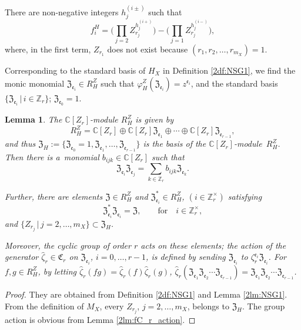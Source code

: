 \documentclass[pdftex]{sigma}
\def\CC{{\mathbb C}}
\def\ZZ{{\mathbb Z}}
\def\fC{{\mathfrak C}}
\def\fZ{{\mathfrak Z}}
\def\fe{{\mathfrak e}}
\def\hzeta{{\widehat \zeta}}
\numberwithin{equation}{section}
\newtheorem{Lemma}[Theorem]{Lemma}
\begin{document}
There are non-negative integers $h_j^{(i\pm)}$ such that
\begin{equation}
f^H_i =
\bigg(
\prod_{j=2} Z_{r_j}^{h_j^{(i+)}}
\bigg)
-\bigg(
\prod_{j=1} Z_{r_j}^{h_j^{(i-)}}
\bigg),
\label{2eq:f^H_iZ}
\end{equation}
where, in the first term, $Z_{r_1}$ does not exist because $(r_1, r_2, \dots, r_{m_X})=1$.





Corresponding to the standard basis of $H_X$ in Definition \ref{2df:NSG1}, we find the monic monomial $\fZ_{\fe_i} \in R_H^Z$ such that $\varphi^Z_H(\fZ_{\fe_i}) = z^{\fe_i}$, and the standard basis $\{\fZ_{\fe_i}\, |\, i \in \ZZ_r\}$; $\fZ_{\fe_0}=1$.

\begin{Lemma}\label{2lm:Z_standardbasis}
The $\CC[Z_r]$-module $R_H^Z$ is given by
\[
R_H^Z=\CC[Z_r]\oplus \CC[Z_r]\fZ_{\fe_1}\oplus \cdots
\oplus \CC[Z_r]\fZ_{\fe_{r-1}},
\]
and thus $\fZ_H:=\{\fZ_{\fe_0}=1, \fZ_{\fe_1}, \dots, \fZ_{\fe_{r-1}}\}$ is the basis of the $\CC[Z_r]$-module~$R_H^Z$.
Then there is a~monomial $b_{i j k}\in \CC[Z_r]$ such that
\[
\fZ_{\fe_i}\fZ_{\fe_j}
=\sum_{k\in \ZZ_r}b_{i j k}\fZ_{\fe_k}.
\]

Further, there are elements $\fZ\in R_H^Z$ and $\fZ_{\fe_i}^*\in R_H^Z$, $(i\in \ZZ_r^\times)$ satisfying
\[
 \fZ_{\fe_i}^* \fZ_{\fe_i}=\fZ, \qquad \text{for} \quad
 i \in \ZZ_r^\times,
\]
and $\{Z_{r_j} \, |\, j=2, \dots, m_X\}\subset \fZ_H$.

Moreover, the cyclic group of order $r$ acts on these elements;
the action of the generator $\hzeta_r \in \fC_r$ on $\fZ_{\fe_i}$, $i=0, \dots, r-1$, is defined by sending $\fZ_{\fe_i}$ to $\zeta_r^{\fe_i}\fZ_{\fe_i}$.
For $f, g \in R_H^Z$, by letting $\hzeta_r (f g) =\hzeta_r (f)\hzeta_r (g)$, $\hzeta_r(\fZ_{\fe_1}\fZ_{\fe_2}\cdots\fZ_{\fe_{r-1}})=\fZ_{\fe_1}\fZ_{\fe_2}\cdots\fZ_{\fe_{r-1}}$.
\end{Lemma}

\begin{proof}
They are obtained from Definition \ref{2df:NSG1} and Lemma \ref{2lm:NSG1}.
From the definition of $M_X$, every $Z_{r_j}$, $j=2, \dots, m_X$, belongs to $\fZ_H$. The group action is obvious from Lemma \ref{2lm:fC_r_action}.
\end{proof}
\end{document}
